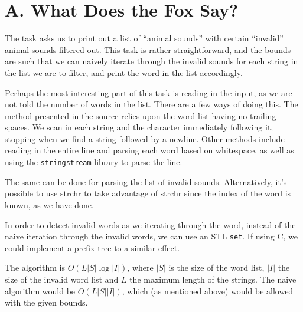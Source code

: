 \section*{A. What Does the Fox Say?}

The task asks us to print out a list of ``animal sounds'' with certain ``invalid''
animal sounds filtered out. This task is rather straightforward, and the bounds
are such that we can naively iterate through the invalid sounds for each string
in the list we are to filter, and print the word in the list accordingly.

Perhaps the most interesting part of this task is reading in the input, as we
are not told the number of words in the list. There are a few ways of doing
this. The method presented in the source relies upon the word list having no
trailing spaces. We scan in each string and the character immediately following
it, stopping when we find a string followed by a newline. Other methods include
reading in the entire line and parsing each word based on whitespace, as well
as using the {\tt stringstream} library to parse the line.

The same can be done for parsing the list of invalid sounds. Alternatively,
it's possible to use strchr to take advantage of strchr since the index of the
word is known, as we have done.

In order to detect invalid words as we iterating through the word, instead of
the naive iteration through the invalid words, we can use an STL {\tt set}. If
using C, we could implement a prefix tree to a similar effect.

The algorithm is $O(L|S|\log|I|)$, where $|S|$ is the size of the word list,
$|I|$ the size of the invalid word list and $L$ the maximum length of the
strings. The naive algorithm would be $O(L|S||I|)$, which (as mentioned above)
would be allowed with the given bounds.
